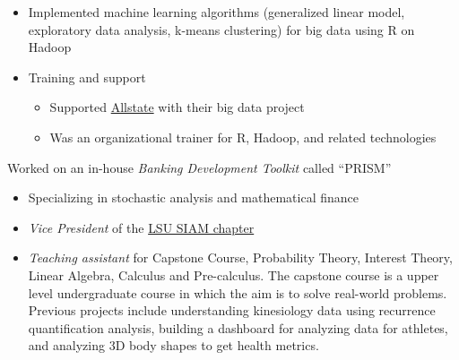 \documentclass[10pt,a4paper]{resume}
\begin{document}
\begin{minipage}[t]{0.62\textwidth}


\begin{itemize}
	\item Implemented machine learning algorithms (generalized linear model, exploratory data analysis, k-means clustering) for big data using R on Hadoop
	\item Training and support
	\begin{itemize}
		\item Supported \href{https://www.allstate.com}{Allstate} with their big data project
		\item Was an organizational trainer for R, Hadoop, and related technologies
	\end{itemize}
\end{itemize}

\divider

Worked on an in-house \emph{Banking Development Toolkit} called “PRISM”



\begin{itemize}
	\item Specializing in stochastic analysis and mathematical finance
	\item \emph{Vice President} of the \href{https://www.math.lsu.edu/siam}{LSU SIAM chapter}
	\item \emph{Teaching assistant} for Capstone Course, Probability Theory, Interest Theory, Linear Algebra, Calculus and Pre-calculus. The capstone course is a upper level undergraduate course in which the aim is to solve real-world problems. Previous projects include understanding kinesiology data using recurrence quantification analysis, building a dashboard for analyzing data for athletes, and analyzing 3D body shapes to get health metrics.
\end{itemize}



\end{minipage}
\end{document}
